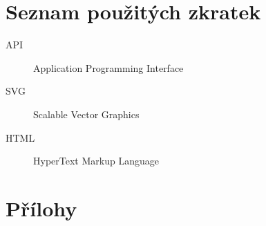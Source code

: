 \documentclass[12pt, a4paper]{report}
\newcommand{\openright}{\clearpage}
\begin{document}
    
    
    
    
    
    \newpage
    \openright
    \tableofcontents
    
    

    
    \listoffigures
    \listoftables

    \chapter*{Seznam použitých zkratek}
    \begin{description}
        \item[API] Application Programming Interface
        \item[SVG] Scalable Vector Graphics
        \item[HTML] HyperText Markup Language
    \end{description}

    \chapter*{Přílohy}
\end{document}

